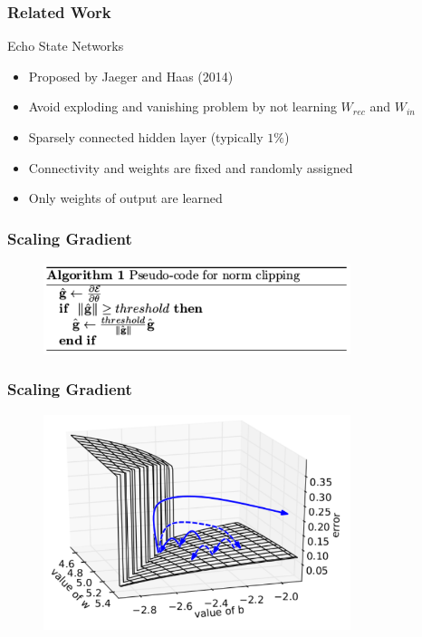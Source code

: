 \documentclass{beamer}
\begin{document}
\begin{frame}
	\frametitle{Related Work}
	
	\begin{block}{Echo State Networks}
		\begin{itemize}
			\item{Proposed by Jaeger and Haas (2014)}
			\item{Avoid exploding and vanishing problem by not learning $W_{rec}$ and $W_{in}$}
			\item{Sparsely connected hidden layer (typically $1\%$)}
			\item{Connectivity and weights are fixed and randomly assigned}
			\item{Only weights of output are learned}
		\end{itemize}
	\end{block}
\end{frame}
	

\begin{frame}
	\frametitle{Scaling Gradient}
	
	\begin{figure}
		\includegraphics[width=0.8\textwidth]{imgs/gradient_clipping}
	\end{figure}
\end{frame}


\begin{frame}
	\frametitle{Scaling Gradient}
	
	\begin{figure}
		\includegraphics[width=0.8\textwidth]{imgs/geometric_perspective}
	\end{figure}
\end{frame}
\end{document}
